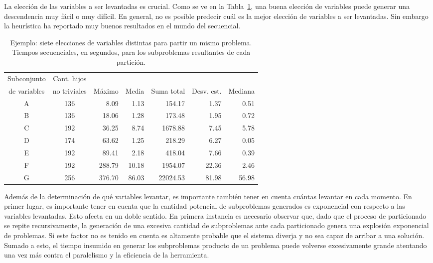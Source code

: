 La elección de las variables a ser levantadas es crucial. Como se ve en
la Tabla~\ref{distrospamela8}, una buena elección de variables puede generar una
descendencia muy fácil o muy difícil. En general, no es posible predecir cuál es
la mejor elección de variables a ser levantadas. Sin embargo la heurística
\vsids ha reportado muy buenos resultados en el mundo del \ssolving secuencial.


\begin{table}
\begin{footnotesize}
\begin{tabular}{ccrrrrr}
\toprule
Subconjunto & Cant. hijos & & & & & \\
de variables & no triviales & M\'aximo & Media & Suma total & Desv.
est. & Mediana \\
\cmidrule(r){1-7}
A 	& 136 	& 8.09 		& 1.13 		& 154.17	 	& 1.37 		& 0.51 \\
B 	& 136 	& 18.06 		& 1.28 		& 173.48	 	& 1.95 		& 0.72 \\
C 	& 192 	& 36.25 		& 8.74 		& 1678.88 	& 7.45 		& 5.78 \\
D	& 174 	& 63.62 		& 1.25 		& 218.29	 	& 6.27 		& 0.05 \\
E	& 192 	& 89.41 		& 2.18 		& 418.04	 	& 7.66 		& 0.39 \\
F 	& 192 	& 288.79	 	& 10.18 		& 1954.07 	& 22.36 		& 2.46 \\
G 	& 256 	& 376.70	 	& 86.03 		& 22024.53 	& 81.98 		& 56.98 \\
\bottomrule
\end{tabular}
\end{footnotesize}
\caption{Ejemplo: siete elecciones de variables distintas para partir un mismo problema. Tiempos secuenciales, en segundos, para los subproblemas resultantes de cada partición.}\label{distrospamela8}
\end{table}


Además de la determinación de qué variables levantar, es importante también
tener en cuenta cuántas levantar en cada momento. En primer lugar, es
importante tener en cuenta que la cantidad potencial de subproblemas generados
es exponencial con respecto a las variables levantadas. Esto afecta en un
doble sentido. En primera instancia es necesario observar que, dado que el
proceso de particionado se repite recursivamente, la generación de una
excesiva cantidad de subproblemas ante cada particionado genera una explosión
exponencial de problemas. Si este factor no es tenido en cuenta es altamente
probable que el sistema diverja y no sea capaz de arribar a una solución.
Sumado a esto, el tiempo insumido en generar los subproblemas producto de un
problema puede volverse excesivamente grande atentando una vez más contra el
paralelismo y la eficiencia de la herramienta.

